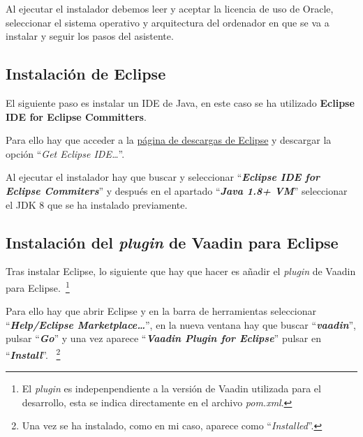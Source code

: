 
Al ejecutar el instalador debemos leer y aceptar la licencia de uso de Oracle, seleccionar el sistema operativo y arquitectura del ordenador en que se va a instalar y seguir los pasos del asistente.

\subsection{Instalación de Eclipse}
El siguiente paso es instalar un IDE de Java, en este caso se ha utilizado \textbf{Eclipse IDE for Eclipse Committers}.

Para ello hay que acceder a la \href{https://www.eclipse.org/downloads/}{página de descargas de Eclipse} y descargar la opción ``\textit{Get Eclipse IDE\dots}''.


Al ejecutar el instalador hay que buscar y seleccionar ``\textbf{\textit{Eclipse IDE for Eclipse Commiters}}'' y después en el apartado ``\textbf{\textit{Java 1.8+ VM}}'' seleccionar el JDK 8 que se ha instalado previamente.


\subsection{Instalación del \textit{plugin} de Vaadin para Eclipse}
Tras instalar Eclipse, lo siguiente que hay que hacer es añadir el \textit{plugin} de Vaadin para Eclipse.~\footnote{El \textit{plugin} es indepenpendiente a la versión de Vaadin utilizada para el desarrollo, esta se indica directamente en el archivo \textit{pom.xml}.}

Para ello hay que abrir Eclipse y en la barra de herramientas seleccionar ``\textbf{\textit{Help/Eclipse Marketplace\dots}}'', en la nueva ventana hay que buscar ``\textbf{\textit{vaadin}}'', pulsar ``\textbf{\textit{Go}}'' y una vez aparece ``\textbf{\textit{Vaadin Plugin for Eclipse}}'' pulsar en ``\textbf{\textit{Install}}''. ~\footnote{Una vez se ha instalado, como en mi caso, aparece como ``\textit{Installed}''.}


